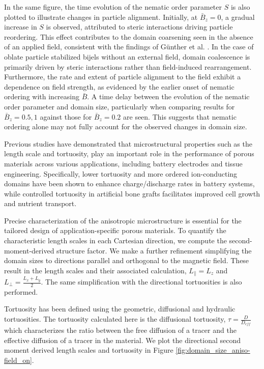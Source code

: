 In the same figure, the time evolution of the nematic order parameter $S$ is also plotted to illustrate changes in particle alignment.
Initially, at $\bar{B}_z = 0$, a gradual increase in $S$ is observed, attributed to steric interactions driving particle reordering.
This effect contributes to the domain coarsening seen in the absence of an applied field, consistent with the findings of Günther et
al. \cite{gunther_timescales_2014}. In the case of oblate particle stabilized bijels without an external field, domain
coalescence is primarily driven by steric interactions rather than field-induced rearrangement. Furthermore, the rate and extent of
particle alignment to the field exhibit a dependence on field strength, as evidenced by the earlier onset of nematic ordering with increasing
$\bar{B}$. A time delay between the evolution of the nematic order parameter and domain size, particularly when comparing results for
$\bar{B}_z = 0.5, 1$ against those for $\bar{B}_z = 0.2$ are seen. This suggests that nematic ordering alone may not fully account for the
observed changes in domain size.

Previous studies have demonstrated that microstructural properties such as the length scale and tortuosity, play an important role in the
performance of porous materials across various applications, including battery electrodes and tissue engineering. \cite{zhang_promoting_2019}
\cite{ebner_tortuosity_2014} \cite{hsieh_architected_2021} Specifically, lower tortuosity and more ordered ion-conducting domains have been shown
to enhance charge/discharge rates in battery systems, while controlled tortuosity in artificial bone grafts facilitates improved cell growth
and nutrient transport.

Precise characterization of the anisotropic microstructure is essential for the tailored design of application-specific porous materials. To
quantify the characteristic length scales in each Cartesian direction, we compute the second-moment-derived structure factor. \cite{jansen_bijels_2011} 
We make a further refinement simplifying the domain sizes to directions parallel and orthogonal to the magnetic field. These result in the length scales and
their associated calculation, $L_{\parallel} = L_{z}$ and $L_{\perp} = \frac{L_x + L_y}{2}$. The same simplification
with the directional tortuosities is also performed. 

Tortuosity has been defined using the geometric, diffusional and hydraulic tortuosities. The tortuosity calculated here is
the diffusional tortuosity, $\tau = \frac{D}{D_{eff}}$ which characterizes the ratio between the free diffusion of a tracer and the
effective diffusion of a tracer in the material. We plot the directional second moment derived length scales and tortuosity in
Figure \ref{fig:domain_size_aniso-field_on}.


